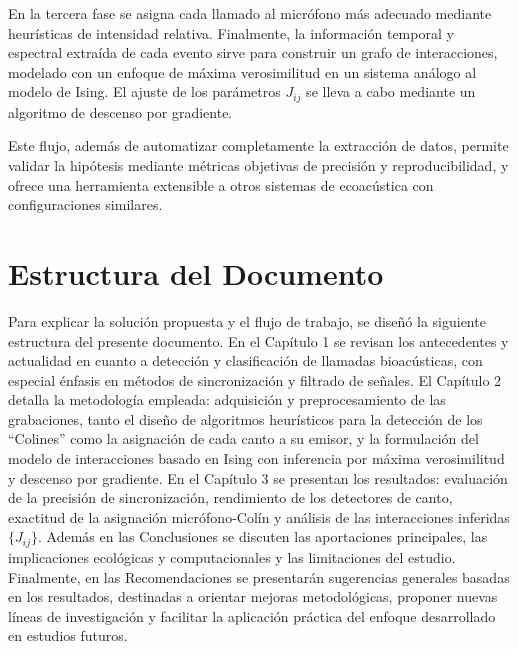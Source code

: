 En la tercera fase se asigna cada 
llamado al micrófono más adecuado mediante heurísticas de 
intensidad relativa. 
Finalmente, la información temporal y espectral extraída de cada 
evento sirve para construir un grafo de interacciones, 
modelado con un enfoque de máxima verosimilitud en un sistema 
análogo al modelo de Ising. El ajuste de los 
parámetros \(J_{ij}\) se lleva a cabo mediante un algoritmo de 
descenso por gradiente.  

Este flujo, además de automatizar completamente la extracción de 
datos, permite validar la hipótesis mediante 
métricas objetivas de precisión y reproducibilidad, y ofrece 
una herramienta extensible a otros sistemas de ecoacústica con 
configuraciones similares.  


\section{Estructura del Documento}
\label{sec:estructura_documento}

Para explicar la solución propuesta y el flujo de trabajo, 
se diseñó la siguiente estructura del presente documento. 
En el Capítulo 1 se revisan los antecedentes y actualidad en cuanto a 
detección y 
clasificación de llamadas bioacústicas, con especial énfasis 
en métodos de sincronización y filtrado de señales. 
El Capítulo 2 detalla la metodología empleada: adquisición y 
preprocesamiento de las grabaciones, tanto el diseño de 
algoritmos heurísticos 
para la detección de los “Colines” como la asignación de cada 
canto a su emisor, y la formulación del modelo de interacciones 
basado en Ising con inferencia por máxima verosimilitud y 
descenso por gradiente. En el Capítulo 3 se presentan los 
resultados: evaluación de la precisión de 
sincronización, rendimiento de los detectores de canto, 
exactitud de la asignación micrófono-Colín y análisis de las 
interacciones inferidas \(\{J_{ij}\}\). Además en las 
Conclusiones se discuten las aportaciones principales, las 
implicaciones ecológicas y computacionales y las limitaciones 
del estudio.
Finalmente, en las Recomendaciones se presentarán sugerencias 
generales basadas en los resultados, destinadas a 
orientar mejoras metodológicas, proponer nuevas líneas de 
investigación y facilitar la aplicación práctica del enfoque 
desarrollado en estudios futuros.  




